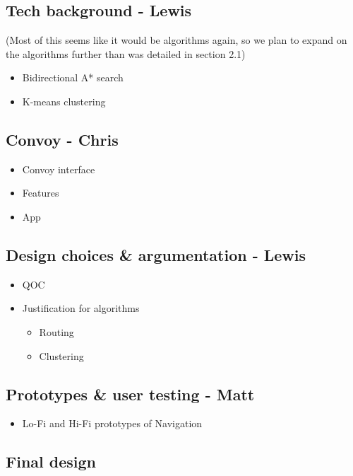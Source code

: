 \documentclass{article}
\begin{document}
\subsection{Tech background - Lewis}\label{ssec:nav-tech}
(Most of this seems like it would be algorithms again, so we plan to expand on the algorithms further than was detailed in section 2.1)
  \begin{itemize}
    \item Bidirectional A* search
    \item K-means clustering
  \end{itemize}

\subsection{Convoy - Chris}\label{ssec:nav-convoy}
	\begin{itemize}
    	\item Convoy interface
        \item Features
        \item App
    \end{itemize}

\subsection{Design choices \& argumentation - Lewis}\label{ssec:nav-design}
  \begin{itemize}
    \item QOC
    \item Justification for algorithms
      \begin{itemize}
        \item Routing
        \item Clustering
      \end{itemize}
  \end{itemize}

\subsection{Prototypes \& user testing - Matt}\label{ssec:nav-prototypes-testing}
\begin{itemize}
	\item Lo-Fi and Hi-Fi prototypes of Navigation
\end{itemize}

\subsection{Final design}\label{ssec:nav-final-design}
\end{document}
